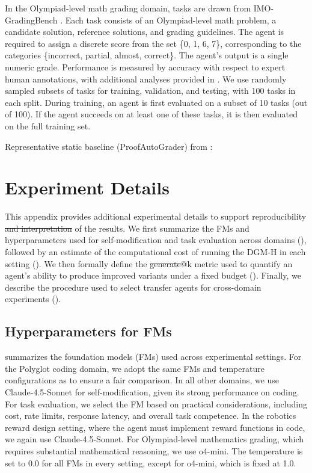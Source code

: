 \documentclass[]{fairmeta}
\providecommand{\DIFaddtex}[1]{{\protect\color{blue}\uwave{#1}}} %
\providecommand{\DIFdeltex}[1]{{\protect\color{red}\sout{#1}}}                      %
\providecommand{\DIFaddbegin}{} %
\providecommand{\DIFaddend}{} %
\providecommand{\DIFdelbegin}{} %
\providecommand{\DIFdelend}{} %
\providecommand{\DIFadd}[1]{\texorpdfstring{\DIFaddtex{#1}}{#1}} %
\providecommand{\DIFdel}[1]{\texorpdfstring{\DIFdeltex{#1}}{}} %
\begin{document}
In the Olympiad-level math grading domain, tasks are drawn from IMO-GradingBench \citep{luong2025towards}. Each task consists of an Olympiad-level math problem, a candidate solution, reference solutions, and grading guidelines. The agent is required to assign a discrete score from the set \{0, 1, 6, 7\}, corresponding to the categories \{incorrect, partial, almost, correct\}. The agent's output is a single numeric grade. Performance is measured by accuracy with respect to expert human annotations, with additional analyses provided in . We use randomly sampled subsets of tasks for training, validation, and testing, with 100 tasks in each split. During training, an agent is first evaluated on a subset of 10 tasks (out of 100). If the agent succeeds on at least one of these tasks, it is then evaluated on the full training set.

Representative static baseline (ProofAutoGrader) from \citet{luong2025towards}:


\section{Experiment Details}
\label{app:exp-details}

This appendix provides additional experimental details to support reproducibility \DIFdelbegin \DIFdel{and interpretation }\DIFdelend of the results. We first summarize the FMs and hyperparameters used for self-modification and task evaluation across domains (), followed by an estimate of the computational cost of running the DGM-H in each setting (). We then formally define the \DIFdelbegin \DIFdel{generate}\DIFdelend \DIFaddbegin \DIFadd{improvement}\DIFaddend @k metric used to quantify an agent's ability to produce improved variants under a fixed budget (). Finally, we describe the procedure used to select transfer agents for cross-domain experiments ().

\subsection{Hyperparameters for FMs}
\label{app:fm-hyperparam}

 summarizes the foundation models (FMs) used across experimental settings. For the Polyglot coding domain, we adopt the same FMs and temperature configurations as \citet{zhang2025darwin} to ensure a fair comparison. In all other domains, we use Claude-4.5-Sonnet for self-modification, given its strong performance on coding. For task evaluation, we select the FM based on practical considerations, including cost, rate limits, response latency, and overall task competence. In the robotics reward design setting, where the agent must implement reward functions in code, we again use Claude-4.5-Sonnet. For Olympiad-level mathematics grading, which requires substantial mathematical reasoning, we use o4-mini. The temperature is set to 0.0 for all FMs in every setting, except for o4-mini, which is fixed at 1.0.
\end{document}
